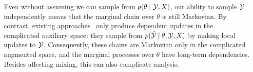 Even without assuming we can sample from $p(\theta\mid\mathcal{Y},X)$, our ability to 
sample $\mathcal{Y}$ independently means that the marginal chain over $\theta$ is still Markovian. By contrast, existing approaches~\citep{adams_gpds, walker11} only produce dependent updates
in the complicated auxiliary space: they sample from $p(\hat{\mathcal{Y}}\mid\theta, \mathcal{Y},X)$ by making local updates to $\mathcal{Y}$. Consequently, these chains are Markovian only in the 
complicated augmented 
space, and the marginal processes over $\theta$ have long-term dependencies. Besides affecting mixing, this can also complicate analysis.




